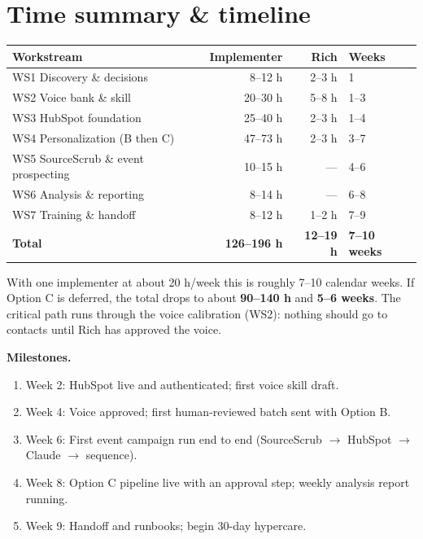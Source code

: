 \documentclass[11pt]{article}
\begin{document}
\section{Time summary \& timeline}
\begin{center}
\renewcommand{\arraystretch}{1.2}\small
\begin{tabular}{L{6.4cm} r r L{2.6cm}}
\toprule
\textbf{Workstream} & \textbf{Implementer} & \textbf{Rich} & \textbf{Weeks} \\
\midrule
WS1 Discovery \& decisions & 8--12 h & 2--3 h & 1 \\
WS2 Voice bank \& skill & 20--30 h & 5--8 h & 1--3 \\
WS3 HubSpot foundation & 25--40 h & 2--3 h & 1--4 \\
WS4 Personalization (B then C) & 47--73 h & 2--3 h & 3--7 \\
WS5 SourceScrub \& event prospecting & 10--15 h & --- & 4--6 \\
WS6 Analysis \& reporting & 8--14 h & --- & 6--8 \\
WS7 Training \& handoff & 8--12 h & 1--2 h & 7--9 \\
\midrule
\textbf{Total} & \textbf{126--196 h} & \textbf{12--19 h} & \textbf{7--10 weeks} \\
\bottomrule
\end{tabular}
\end{center}
With one implementer at about 20 h/week this is roughly 7--10 calendar weeks. If Option C is
deferred, the total drops to about \textbf{90--140 h} and \textbf{5--6 weeks}. The critical
path runs through the voice calibration (WS2): nothing should go to contacts until Rich has
approved the voice.

\textbf{Milestones.}
\begin{enumerate}
  \item Week 2: HubSpot live and authenticated; first voice skill draft.
  \item Week 4: Voice approved; first human-reviewed batch sent with Option B.
  \item Week 6: First event campaign run end to end (SourceScrub $\rightarrow$ HubSpot
  $\rightarrow$ Claude $\rightarrow$ sequence).
  \item Week 8: Option C pipeline live with an approval step; weekly analysis report running.
  \item Week 9: Handoff and runbooks; begin 30-day hypercare.
\end{enumerate}
\end{document}
